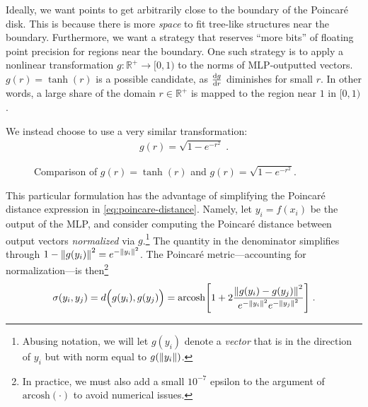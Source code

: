 \documentclass{article}
\begin{document}
Ideally, we want points to get arbitrarily close to the boundary of the Poincaré disk. This is because there is more \emph{space} to fit tree-like structures near the boundary. Furthermore, we want a strategy that reserves ``more bits'' of floating point precision for regions near the boundary. One such strategy is to apply a nonlinear transformation $g: \mathbb R^+ \to [0, 1)$ to the norms of MLP-outputted vectors. $g(r) = \tanh(r)$ is a possible candidate, as $\dv{g}{r}$ diminishes for small $r$. In other words, a large share of the domain $r \in \mathbb R^+$ is mapped to the region near $1$ in $[0, 1)$.

We instead choose to use a very similar transformation:
\begin{align}
  g(r) = \sqrt{1 - e^{-r^2}} \; . \label{eq:radial-transformation}
\end{align}

\begin{figure}[H]
  \centering
  \caption{Comparison of $g(r) = \tanh(r)$ and $g(r) = \sqrt{1 - e^{-r^2}}$.}
  \label{fig:radial-transformations}
\end{figure}

This particular formulation has the advantage of simplifying the Poincaré distance expression in \eqref{eq:poincare-distance}. Namely, let $y_i = f(x_i)$ be the output of the MLP, and consider computing the Poincaré distance between output vectors \emph{normalized} via $g$.\footnote{Abusing notation, we will let $g(y_i)$ denote a \emph{vector} that is in the direction of $y_i$ but with norm equal to $g(\norm{y_i})$.} The quantity in the denominator simplifies through $1 - \norm{g(y_i)}^2 = e^{-\norm{y_i}^2}$. The Poincaré metric---accounting for normalization---is then\footnote{In practice, we must also add a small $10^{-7}$ epsilon to the argument of $\text{arcosh}(\cdot)$ to avoid numerical issues.}
\begin{align}
  \sigma(y_i, y_j)
  = d \Big( g(y_i), g(y_j) \Big)
  = \text{arcosh} \qty[1 + 2 \frac{\norm{g(y_i) - g(y_j)}^2}{e^{-\norm{y_i}^2} e^{-\norm{y_j}^2}}] \; .
\end{align}
\end{document}
